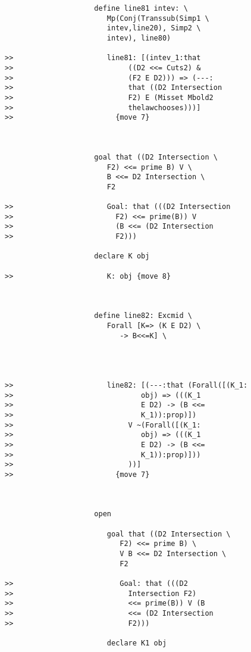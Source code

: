 \documentclass[12pt]{article}
\begin{document}
\begin{verbatim}
                     define line81 intev: \
                        Mp(Conj(Transsub(Simp1 \
                        intev,line20), Simp2 \
                        intev), line80)

>>                      line81: [(intev_1:that
>>                           ((D2 <<= Cuts2) &
>>                           (F2 E D2))) => (---:
>>                           that ((D2 Intersection
>>                           F2) E (Misset Mbold2
>>                           thelawchooses)))]
>>                        {move 7}



                     goal that ((D2 Intersection \
                        F2) <<= prime B) V \
                        B <<= D2 Intersection \
                        F2

>>                      Goal: that (((D2 Intersection
>>                        F2) <<= prime(B)) V
>>                        (B <<= (D2 Intersection
>>                        F2)))

                     declare K obj

>>                      K: obj {move 8}



                     define line82: Excmid \
                        Forall [K=> (K E D2) \
                           -> B<<=K] \
                        



>>                      line82: [(---:that (Forall([(K_1:
>>                              obj) => (((K_1
>>                              E D2) -> (B <<=
>>                              K_1)):prop)])
>>                           V ~(Forall([(K_1:
>>                              obj) => (((K_1
>>                              E D2) -> (B <<=
>>                              K_1)):prop)]))
>>                           ))]
>>                        {move 7}



                     open

                        goal that ((D2 Intersection \
                           F2) <<= prime B) \
                           V B <<= D2 Intersection \
                           F2

>>                         Goal: that (((D2
>>                           Intersection F2)
>>                           <<= prime(B)) V (B
>>                           <<= (D2 Intersection
>>                           F2)))

                        declare K1 obj


\end{verbatim}
\end{document}
